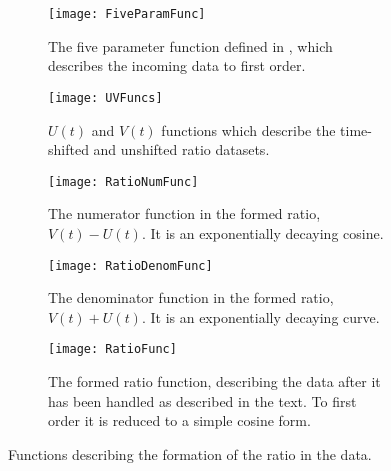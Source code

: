     \begin{figure}[]
    \centering
        \begin{subfigure}[t]{0.45\textwidth}
            \centering
            \texttt{[image: FiveParamFunc]}
            \caption{The five parameter function defined in , which describes the incoming data to first order.}
        \label{fig:fiveparamfunc}
        \end{subfigure}%

        \vspace{2mm}
        \begin{subfigure}[t]{0.45\textwidth}
            \centering
            \texttt{[image: UVFuncs]}
            \caption{$U(t)$ and $V(t)$ functions which describe the time-shifted and unshifted ratio datasets.}
        \label{fig:UVfuncs}
        \end{subfigure}
        \hspace{5mm}
        \begin{subfigure}[t]{0.45\textwidth}
            \centering
            \texttt{[image: RatioNumFunc]}
            \caption{The numerator function in the formed ratio, $V(t) - U(t)$. It is an exponentially decaying cosine.}
        \label{fig:rationumfunc}
        \end{subfigure}%
        \vspace{2mm}
        \begin{subfigure}[t]{0.45\textwidth}
            \centering
            \texttt{[image: RatioDenomFunc]}
            \caption{The denominator function in the formed ratio, $V(t) + U(t)$. It is an exponentially decaying curve.}
        \label{fig:ratiodenomfunc}
        \end{subfigure}
        \hspace{5mm}
        \begin{subfigure}[t]{0.45\textwidth}
            \centering
            \texttt{[image: RatioFunc]}
            \caption{The formed ratio function, describing the data after it has been handled as described in the text. To first order it is reduced to a simple cosine form.}
        \label{fig:ratiofunc}
        \end{subfigure}%
    \caption[Ratio formation functions]{Functions describing the formation of the ratio in the data.}
    \label{fig:RatioFormationFunctions}
    \end{figure}


